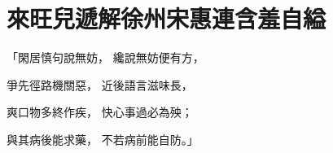 %

\chapter{來旺兒遞解徐州\KG 宋惠連含羞自縊}


\begin{showcontents}{}



「閑居慎句說無妨，  纔說無妨便有方，

爭先徑路機關惡，  近後語言滋味長，

爽口物多終作疾，  快心事過必為殃；

與其病後能求藥，  不若病前能自防。」


\end{showcontents}
